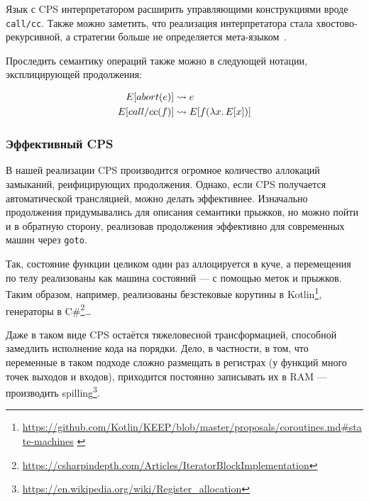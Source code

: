Язык с CPS интерпретатором расширить управляющими конструкциями вроде \texttt{call/cc}.
Также можно заметить, что реализация интерпретатора стала хвостово-рекурсивной, а стратегии больше не определяется мета-языком~\cite{reynolds1972definitional}.


Проследить семантику операций также можно в следующей нотации, эксплицирующей продолжения:

\begin{align*}
    E[abort(e)] &\rightsquigarrow e\\
    E[call/cc(f)] &\rightsquigarrow E[f(\lambda x\ldotp E[x])]
\end{align*}

\subsubsection{Эффективный CPS}

В нашей реализации CPS производится огромное количество аллокаций замыканий, реифицирующих продолжения.
Однако, если CPS получается автоматической трансляцией, можно делать эффективнее.
Изначально продолжения придумывались для описания семантики прыжков, но можно пойти и в обратную сторону, реализовав продолжения эффективно для современных машин через \texttt{goto}.

Так, состояние функции целиком один раз аллоцируется в куче, а перемещения по телу реализованы как машина состояний --- с помощью меток и прыжков.
Таким образом, например, реализованы безстековые корутины в Kotlin\footnote{\url{https://github.com/Kotlin/KEEP/blob/master/proposals/coroutines.md\#state-machines} \label{note:kotlin-state}}, генераторы в C\#\footnote{\url{https://csharpindepth.com/Articles/IteratorBlockImplementation}}\ldots

Даже в таком виде CPS остаётся тяжеловесной трансформацией, способной замедлить исполнение кода на порядки.
Дело, в частности, в том, что переменные в таком подходе сложно размещать в регистрах (у функций много точек выходов и входов), приходится постоянно записывать их в RAM --- производить spilling\footnote{\url{https://en.wikipedia.org/wiki/Register_allocation}}.



%
%
%

